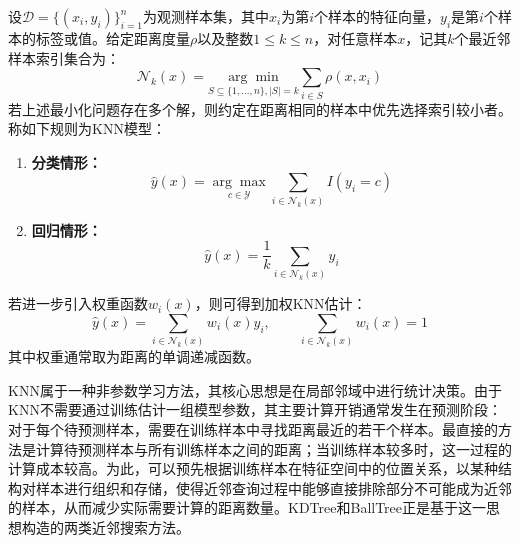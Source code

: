 \begin{definition}
	设$\mathcal{D}=\{(x_i,y_i)\}_{i=1}^{n}$为观测样本集，其中$x_i$为第$i$个样本的特征向量，$y_i$是第$i$个样本的标签或值。给定距离度量$\rho$以及整数$1\leqslant k\leqslant n$，对任意样本$x$，记其$k$个最近邻样本索引集合为：
	\begin{equation*}
		\mathcal{N}_k(x)=\underset{S\subseteq\{1,\dots,n\},|S|=k}{\arg\min}\sum_{i\in S}\rho(x,x_i)
	\end{equation*}
	若上述最小化问题存在多个解，则约定在距离相同的样本中优先选择索引较小者。
	称如下规则为\gls{KNN}模型：
	\begin{enumerate}
		\item \textbf{分类情形：}
		\begin{equation*}
			\hat y(x)=\underset{c\in\mathcal{Y}}{\arg\max}\sum_{i\in\mathcal{N}_k(x)}I(y_i=c)
		\end{equation*}
		\item \textbf{回归情形：}
		\begin{equation*}
			\hat y(x)=\frac{1}{k}\sum_{i\in\mathcal{N}_k(x)}y_i
		\end{equation*}
	\end{enumerate}
	若进一步引入权重函数$w_i(x)$，则可得到加权KNN估计：
	\begin{equation*}
		\hat y(x)=\sum_{i\in\mathcal{N}_k(x)}w_i(x)y_i,\qquad\sum_{i\in\mathcal{N}_k(x)}w_i(x)=1
	\end{equation*}
	其中权重通常取为距离的单调递减函数。
\end{definition}
KNN属于一种非参数学习方法，其核心思想是在局部邻域中进行统计决策。由于KNN不需要通过训练估计一组模型参数，其主要计算开销通常发生在预测阶段：对于每个待预测样本，需要在训练样本中寻找距离最近的若干个样本。最直接的方法是计算待预测样本与所有训练样本之间的距离；当训练样本较多时，这一过程的计算成本较高。为此，可以预先根据训练样本在特征空间中的位置关系，以某种结构对样本进行组织和存储，使得近邻查询过程中能够直接排除部分不可能成为近邻的样本，从而减少实际需要计算的距离数量。\gls{KDTree}和\gls{BallTree}正是基于这一思想构造的两类近邻搜索方法。

